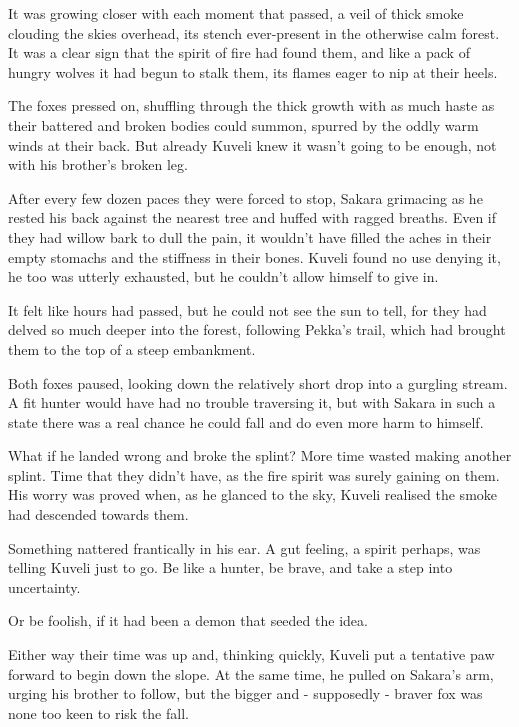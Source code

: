 \secdiv

\noindent It was growing closer with each moment that passed, a veil of thick smoke clouding the skies overhead, its stench ever-present in the otherwise calm forest. It was a clear sign that the spirit of fire had found them, and like a pack of hungry wolves it had begun to stalk them, its flames eager to nip at their heels.

The foxes pressed on, shuffling through the thick growth with as much haste as their battered and broken bodies could summon, spurred by the oddly warm winds at their back. But already Kuveli knew it wasn't going to be enough, not with his brother's broken leg.

After every few dozen paces they were forced to stop, Sakara grimacing as he rested his back against the nearest tree and huffed with ragged breaths. Even if they had willow bark to dull the pain, it wouldn't have filled the aches in their empty stomachs and the stiffness in their bones. Kuveli found no use denying it, he too was utterly exhausted, but he couldn't allow himself to give in.

It felt like hours had passed, but he could not see the sun to tell, for they had delved so much deeper into the forest, following Pekka's trail, which had brought them to the top of a steep embankment.

Both foxes paused, looking down the relatively short drop into a gurgling stream. A fit hunter would have had no trouble traversing it, but with Sakara in such a state there was a real chance he could fall and do even more harm to himself.

What if he landed wrong and broke the splint? More time wasted making another splint. Time that they didn't have, as the fire spirit was surely gaining on them. His worry was proved when, as he glanced to the sky, Kuveli realised the smoke had descended towards them.

Something nattered frantically in his ear. A gut feeling, a spirit perhaps, was telling Kuveli just to go. Be like a hunter, be brave, and take a step into uncertainty.

Or be foolish, if it had been a demon that seeded the idea.

Either way their time was up and, thinking quickly, Kuveli put a tentative paw forward to begin down the slope. At the same time, he pulled on Sakara's arm, urging his brother to follow, but the bigger and - supposedly - braver fox was none too keen to risk the fall.

